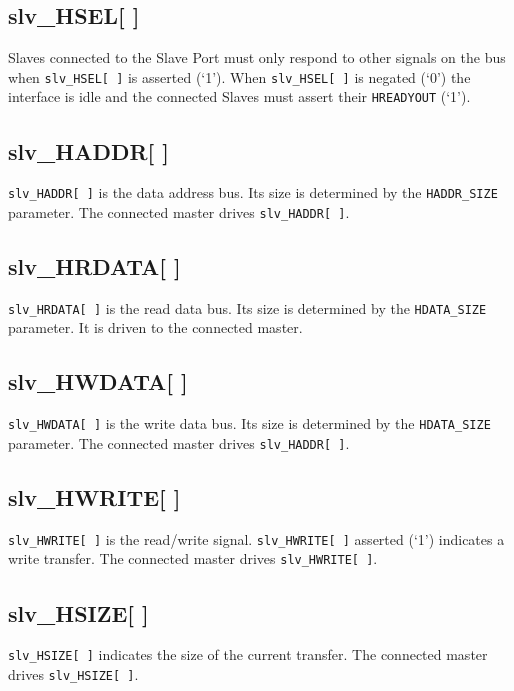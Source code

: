 \subsection{slv\_HSEL[ ]}\label{slv_hsel}

Slaves connected to the Slave Port must only respond to other signals on the bus when
\texttt{slv\_HSEL[\,]} is asserted (`1'). When \texttt{slv\_HSEL[\,]} is negated (`0') the
interface is idle and the connected Slaves must assert their \texttt{HREADYOUT} (`1').

\subsection{slv\_HADDR[ ]}\label{slv_haddr}

\texttt{slv\_HADDR[\,]} is the data address bus. Its size is determined by the
\texttt{HADDR\_SIZE} parameter. The connected master drives \texttt{slv\_HADDR[\,]}.

\subsection{slv\_HRDATA[ ]}\label{slv_hrdata}

\texttt{slv\_HRDATA[ ]} is the read data bus. Its size is determined by the
\texttt{HDATA\_SIZE} parameter. It is driven to the connected master.

\subsection{slv\_HWDATA[ ]}\label{slv_hwdata}

\texttt{slv\_HWDATA[\,]} is the write data bus. Its size is determined by the
\texttt{HDATA\_SIZE} parameter. The connected master drives \texttt{slv\_HADDR[\,]}.

\subsection{slv\_HWRITE[ ]}\label{slv_hwrite}

\texttt{slv\_HWRITE[\,]} is the read/write signal. \texttt{slv\_HWRITE[\,]} asserted (`1') indicates a
write transfer. The connected master drives \texttt{slv\_HWRITE[\,]}.

\subsection{slv\_HSIZE[ ]}\label{slv_hsize}

\texttt{slv\_HSIZE[\,]} indicates the size of the current transfer. The connected
master drives \texttt{slv\_HSIZE[\,]}.

